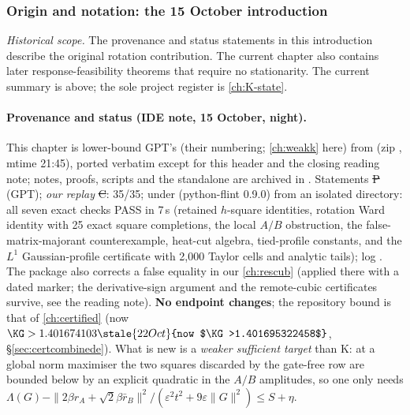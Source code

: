 \subsubsection*{Origin and notation: the 15 October introduction}
\noindent\emph{Historical scope.} The provenance and status statements in this
introduction describe the original rotation contribution. The current chapter
also contains later response-feasibility theorems that require no stationarity.
The current summary is above; the sole project register is
\autoref{ch:K-state}.

\paragraph{Provenance and status (IDE note, 15 October, night).} This chapter is lower-bound GPT's  (their numbering; \autoref{ch:weakk} here) from
 (zip , mtime 21:45), ported verbatim except for this header and the closing
reading note; notes, proofs, scripts and the standalone  are archived in . Statements \st{P} (GPT);
\emph{our replay} \st{C}:  35/35;  under  (python-flint 0.9.0) from an isolated directory: all seven exact checks PASS in 7\,s
(retained $h$-square identities, rotation Ward identity with 25 exact square completions, the local $A/B$ obstruction, the false-matrix-majorant counterexample, heat-cut algebra, tied-profile
constants, and the $L^1$ Gaussian-profile certificate with 2,000 Taylor cells and analytic tails); log . The package also corrects a false
equality in our \autoref{ch:rescub} (applied there with a dated marker; the derivative-sign argument and the remote-cubic certificates survive, see the reading note). \textbf{No endpoint
changes}; the repository bound is that of \autoref{ch:certified} (now $\KG>1.401674103\stale{22 Oct}{now $\KG>1.401695322458$}$, \S\ref{sec:certcombinede}). What is new is a \emph{weaker sufficient target} than K: at a global norm maximiser the two squares discarded by the
gate-free row are bounded below by an explicit quadratic in the $A/B$ amplitudes, so one only needs $\Lambda(G)-\|2\beta r_A+\sqrt2\beta\bar r_B\|^2/(\varepsilon^2t^2+9\varepsilon\|G\|^2)\le S+\eta$.



